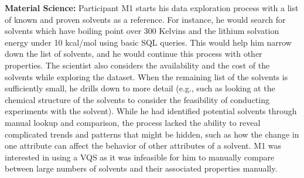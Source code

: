 \par \textbf{Material Science:} Participant M1 starts his data exploration process with a list of known and proven solvents as a reference. For instance, he would search for solvents which have boiling point over 300 Kelvins and the lithium solvation energy under 10 kcal/mol using basic SQL queries. This would help him narrow down the list of solvents, and he would continue this process with other properties. The scientist also considers the availability and the cost of the solvents while exploring the dataset. When the remaining list of the solvents is sufficiently small, he drills down to more detail (e.g., such as looking at the chemical structure of the solvents to consider the feasibility of conducting experiments with the solvent). While he had identified potential solvents through  manual lookup and comparison,  the process lacked the ability to reveal complicated trends and patterns that might be hidden, such as how the change in one attribute can affect the behavior of other attributes of a solvent. M1 was interested in using a VQS as it was infeasible for him to manually compare between large numbers of solvents and their associated properties manually.
\raggedbottom